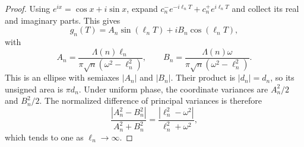 \documentclass[11pt]{amsart}
\numberwithin{equation}{section}
\theoremstyle{plain}
\theoremstyle{definition}
\theoremstyle{remark}
\newcommand{\1}{\mathbf{1}}
\begin{document}
\begin{proof}
Using \(e^{ix}=\cos x+i\sin x\), expand
\(c_n^-e^{-i\ell_nT}+c_n^+e^{i\ell_nT}\) and collect its real and
imaginary parts.  This gives
\begin{equation}
g_n(T)=A_n\sin(\ell_nT)+iB_n\cos(\ell_nT),
\label{eq:ellipse_parametric_proof}
\end{equation}
with
\begin{equation}
A_n=
\frac{\Lambda(n)\ell_n}{\pi\sqrt n(\omega^2-\ell_n^2)},
\qquad
B_n=
\frac{\Lambda(n)\omega}{\pi\sqrt n(\omega^2-\ell_n^2)}.
\label{eq:ellipse_axes_proof}
\end{equation}
This is an ellipse with semiaxes \(|A_n|\) and \(|B_n|\).  Their product
is \(|d_n|=d_n\), so its unsigned area is \(\pi d_n\).  Under uniform
phase, the coordinate variances are \(A_n^2/2\) and \(B_n^2/2\).  The
normalized difference of principal variances is therefore
\begin{equation}
\frac{|A_n^2-B_n^2|}{A_n^2+B_n^2}
=
\frac{|\ell_n^2-\omega^2|}{\ell_n^2+\omega^2},
\label{eq:anisotropy_proof_ratio}
\end{equation}
which tends to one as \(\ell_n\to\infty\).
\end{proof}
\end{document}
